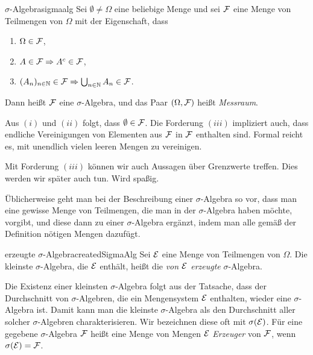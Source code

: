 \documentclass[language=ngerman]{../../Template/TemplateLecture}
\begin{document}
\begin{defi}{$\sigma$-Algebra}{sigmaalg}
    Sei $\emptyset \neq \Omega$ eine beliebige Menge und sei $\mathcal{F}$ eine Menge von Teilmengen von $\Omega$ mit der Eigenschaft, dass 
    \begin{enumerate}[$(i)$]
        \item $\Omega \in \mathcal{F}$,
        \item $A \in \mathcal{F} \Rightarrow A^c \in \mathcal{F}$,
        \item $(A_n)_{n \in \mathbb{N}} \in \mathcal{F} \Rightarrow \bigcup_{n \in \mathbb{N}} A_n \in \mathcal{F}$. 
    \end{enumerate}
    Dann heißt $\mathcal{F}$ eine $\sigma$-Algebra, und das Paar $(\Omega, \mathcal{F})$ heißt \emph{Messraum}.
\end{defi}

\begin{bemerkung}
    Aus $(i)$ und $(ii)$ folgt, dass $\emptyset \in \mathcal{F}$. Die Forderung $(iii)$ impliziert auch, dass endliche Vereinigungen von Elementen aus $\mathcal{F}$ in $\mathcal{F}$ enthalten sind. Formal reicht es, mit unendlich vielen leeren Mengen zu vereinigen.
\end{bemerkung}

Mit Forderung $(iii)$ können wir auch Aussagen über Grenzwerte treffen. Dies werden wir später auch tun. Wird spaßig.

Üblicherweise geht man bei der Beschreibung einer $\sigma$-Algebra so vor, dass man eine gewisse Menge von Teilmengen, die man in der $\sigma$-Algebra haben möchte, vorgibt, und diese dann zu einer $\sigma$-Algebra ergänzt, indem man alle gemäß der Deﬁnition nötigen Mengen dazufügt.

\begin{defi}{erzeugte $\sigma$-Algebra}{createdSigmaAlg}
    Sei $\mathcal{E}$ eine Menge von Teilmengen von $\Omega$. Die kleinste $\sigma$-Algebra, die $\mathcal{E}$ enthält, heißt die \emph{von $\mathcal{E}$ erzeugte} $\sigma$-Algebra.
\end{defi}

Die Existenz einer kleinsten $\sigma$-Algebra folgt aus der Tatsache, dass der Durchschnitt von $\sigma$-Algebren, die ein Mengensystem $\mathcal{E}$ enthalten, wieder eine $\sigma$-Algebra ist. Damit kann man die kleinste $\sigma$-Algebra als den Durchschnitt aller solcher $\sigma$-Algebren charakterisieren. Wir bezeichnen diese oft mit $\sigma(\mathcal{E})$. Für eine gegebene $\sigma$-Algebra $\mathcal{F}$ heißt eine Menge von Mengen $\mathcal{E}$ \emph{Erzeuger} von $\mathcal{F}$, wenn $\sigma(\mathcal{E}) = \mathcal{F}$.
\end{document}
